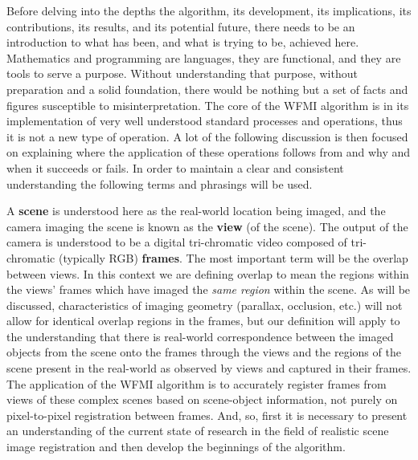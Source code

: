 %
%
%
%
%
%
%
%
%

%
%
%


Before delving into the depths the algorithm, its development, its implications, its contributions, its results, and its potential future, there needs to be an introduction to what has been, and what is trying to be, achieved here. Mathematics and programming are languages, they are functional, and they are tools to serve a purpose. Without understanding that purpose, without preparation and a solid foundation, there would be nothing but a set of facts and figures susceptible to misinterpretation. The core of the WFMI algorithm is in its implementation of very well understood standard processes and operations, thus it is not a new type of operation. A lot of the following discussion is then focused on explaining where the application of these operations follows from and why and when it succeeds or fails. In order to maintain a clear and consistent understanding the following terms and phrasings will be used.

A \textbf{scene} is understood here as the real-world location being imaged, and the camera imaging the scene is known as the \textbf{view} (of the scene). The output of the camera is understood to be a digital tri-chromatic video composed of tri-chromatic (typically RGB) \textbf{frames}. The most important term will be the overlap between views. In this context we are defining overlap to mean the regions within the views' frames which have imaged the \textit{same region} within the scene. As will be discussed, characteristics of imaging geometry (parallax, occlusion, etc.) will not allow for identical overlap regions in the frames, but our definition will apply to the understanding that there is real-world correspondence between the imaged objects from the scene onto the frames through the views and the regions of the scene present in the real-world as observed by views and captured in their frames. The application of the WFMI algorithm is to accurately register frames from views of these complex scenes based on scene-object information, not purely on pixel-to-pixel registration between frames. And, so, first it is necessary to present an understanding of the current state of research in the field of realistic scene image registration and then develop the beginnings of the algorithm.


